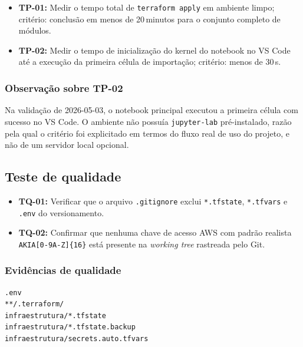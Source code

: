 \begin{itemize}[leftmargin=*]
  \item \textbf{TP-01:} Medir o tempo total de \texttt{terraform apply}
        em ambiente limpo; crit\'erio: conclus\~ao em menos de
        20\,minutos para o conjunto completo de m\'odulos.
  \item \textbf{TP-02:} Medir o tempo de inicializa\c{c}\~ao do
      kernel do notebook no VS Code at\'e a execu\c{c}\~ao da primeira
      c\'elula de importa\c{c}\~ao; crit\'erio: menos de 30\,s.
\end{itemize}

\subsubsection*{Observa\c{c}\~ao sobre TP-02}

Na valida\c{c}\~ao de 2026-05-03, o notebook principal executou a
primeira c\'elula com sucesso no VS Code. O ambiente n\~ao possu\'ia
\texttt{jupyter-lab} pr\'e-instalado, raz\~ao pela qual o crit\'erio foi
explicitado em termos do fluxo real de uso do projeto, e n\~ao de um
servidor local opcional.

\subsection{Teste de qualidade}

\begin{itemize}[leftmargin=*]
  \item \textbf{TQ-01:} Verificar que o arquivo
        \texttt{.gitignore} exclui \texttt{*.tfstate},
        \texttt{*.tfvars} e \texttt{.env} do versionamento.
  \item \textbf{TQ-02:} Confirmar que nenhuma chave de acesso AWS
                        com padr\~ao realista \texttt{AKIA[0-9A-Z]\{16\}} est\'a
                        presente na \textit{working tree} rastreada pelo Git.
\end{itemize}

\subsubsection*{Evid\^encias de qualidade}

\begin{lstlisting}[language=bash,
      caption={TQ-01 --- fragmento relevante do \texttt{.gitignore}.},
      label={lst:cap2_gitignore_output}]
.env
**/.terraform/
infraestrutura/*.tfstate
infraestrutura/*.tfstate.backup
infraestrutura/secrets.auto.tfvars
\end{lstlisting}

